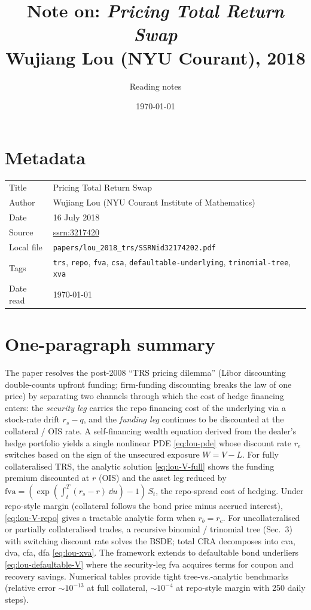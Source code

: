 \documentclass[11pt,a4paper]{article}
\title{Note on: \emph{Pricing Total Return Swap}\\
       \large Wujiang Lou (NYU Courant), 2018}
\author{Reading notes}
\date{\today}
\begin{document}
\maketitle

\section*{Metadata}
\begin{tabular}{@{}p{3.5cm}p{11cm}@{}}
\toprule
Title           & Pricing Total Return Swap \\
Author          & Wujiang Lou (NYU Courant Institute of Mathematics) \\
Date            & 16 July 2018 \\
Source          & \href{https://ssrn.com/abstract=3217420}{ssrn:3217420} \\
Local file      & \texttt{papers/lou\_2018\_trs/SSRNid32174202.pdf} \\
Tags            & \texttt{trs}, \texttt{repo}, \texttt{fva}, \texttt{csa},
                  \texttt{defaultable-underlying}, \texttt{trinomial-tree}, \texttt{xva} \\
Date read       & \today \\
\bottomrule
\end{tabular}

\section*{One-paragraph summary}
The paper resolves the post-2008 ``TRS pricing dilemma'' (Libor
discounting double-counts upfront funding; firm-funding discounting
breaks the law of one price) by separating two channels through which
the cost of hedge financing enters: the \emph{security leg} carries
the repo financing cost of the underlying via a stock-rate drift
$r_s - q$, and the \emph{funding leg} continues to be discounted at
the collateral / OIS rate. A self-financing wealth equation derived
from the dealer's hedge portfolio yields a single nonlinear PDE
\eqref{eq:lou-pde} whose discount rate $r_e$ switches based on the
sign of the unsecured exposure $W = V - L$. For fully collateralised
TRS, the analytic solution \eqref{eq:lou-V-full} shows the funding
premium discounted at $r$ (OIS) and the asset leg reduced by
$\mathrm{fva} = (\exp(\int_t^T (r_s - r)\,\dd u) - 1)\, S_t$, the
repo-spread cost of hedging. Under repo-style margin (collateral
follows the bond price minus accrued interest), \eqref{eq:lou-V-repo}
gives a tractable analytic form when $r_b = r_c$. For
uncollateralised or partially collateralised trades, a
recursive binomial / trinomial tree (Sec.\ 3) with switching discount
rate solves the BSDE; total CRA decomposes into cva, dva, cfa, dfa
\eqref{eq:lou-xva}. The framework extends to defaultable bond
underliers \eqref{eq:lou-defaultable-V} where the security-leg fva
acquires terms for coupon and recovery savings. Numerical tables
provide tight tree-vs.-analytic benchmarks (relative error $\sim
10^{-13}$ at full collateral, $\sim 10^{-4}$ at repo-style margin
with 250 daily steps).
\end{document}
